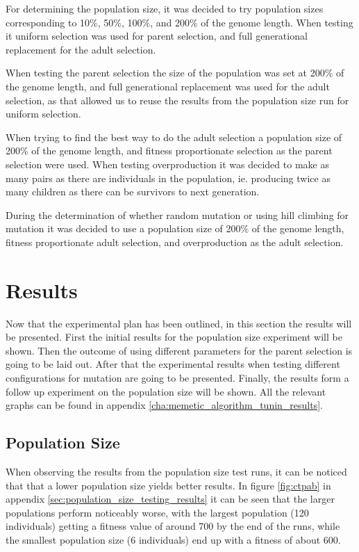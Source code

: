 For determining the population size, it was decided to try population sizes corresponding to 10\%, 50\%, 100\%, and 200\% of the genome length. When testing it uniform selection was used for parent selection, and full generational replacement for the adult selection.

When testing the parent selection the size of the population was set at 200\% of the genome length, and full generational replacement was used for the adult selection, as that allowed us to reuse the results from the population size run for uniform selection.

When trying to find the best way to do the adult selection a population size of 200\% of the genome length, and fitness proportionate selection as the parent selection were used. When testing overproduction it was decided to make as many pairs as there are individuals in the population, ie. producing twice as many children as there can be survivors to next generation.

During the determination of whether random mutation or using hill climbing for mutation it was decided to use a population size of 200\% of the genome length, fitness proportionate adult selection, and overproduction as the adult selection.



\section{Results} %
\label{sec:results}

Now that the experimental plan has been outlined, in this section the results will be presented. First the initial results for the population size experiment will be shown. Then the outcome of using different parameters for the parent selection is going to be laid out. After that the experimental results when testing different configurations for mutation are going to be presented. Finally, the results form a follow up experiment on the population size will be shown. All the relevant graphs can be found in appendix \ref{cha:memetic_algorithm_tunin_results}.

\subsection{Population Size} %
\label{sub:population_size}

When observing the results from the population size test runs, it can be noticed that that a lower population size yields better results. In figure \ref{fig:ctpab} in appendix \ref{sec:population_size_testing_results} it can be seen that the larger populations perform noticeably worse, with the largest population (120 individuals) getting a fitness value of around 700 by the end of the runs, while the smallest population size (6 individuals) end up with a fitness of about 600.

